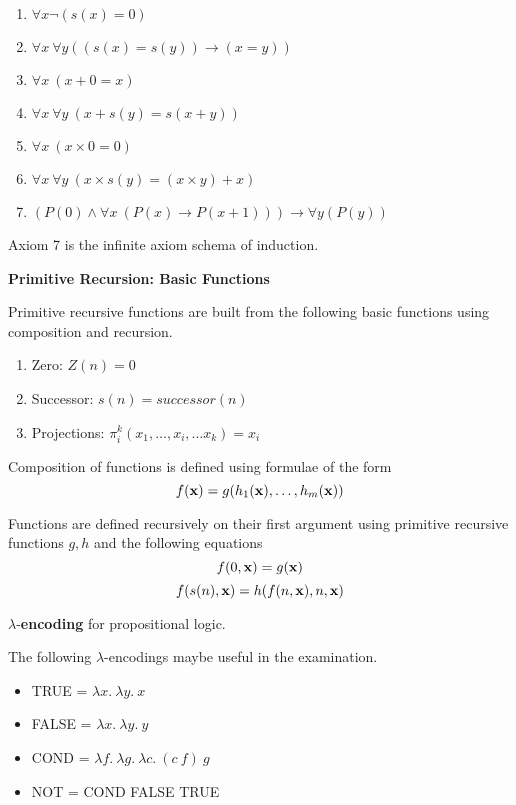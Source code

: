 \documentclass[11pt]{report}
\begin{document}
\begin{enumerate}
	\item $\forall x \lnot(s(x) = 0)$
	\item $\forall x \ \forall y ((s(x) = s(y)) \to (x = y))$
	\item $\forall x \ (x + 0 = x)$
	\item $\forall x \ \forall y \ (x + s(y) = s(x + y))$
	\item $\forall x \ (x \times 0 = 0)$
	\item $\forall x \ \forall y \ (x \times s(y) = (x \times y) + x)$
	\item $(P(0) \land \forall x \ (P(x) \to P(x+1))) \rightarrow \forall y (P(y))$
\end{enumerate}
Axiom 7 is the infinite axiom schema of induction. 

\vspace{0.75cm}

{\bf Primitive Recursion: Basic Functions}

Primitive recursive functions are built from the following basic functions using composition and recursion.

\begin{enumerate}
	\item[] Zero: $Z(n) = 0$
	\item[] Successor: $s(n) = successor(n)$
	\item[] Projections: $\pi_{i}^{k}(x_{1},\dots, x_{i},\dots x_{k}) = x_{i}$
\end{enumerate}

Composition of functions is defined using formulae of the form 
$$f({\bf x}) = g(h_{1}({\bf x}),\dots , h_{m}({\bf x}))$$

Functions are defined recursively on their first argument using primitive recursive functions $g,h$ and the following equations 
$$f(0,{\bf x}) = g({\bf x})$$
$$f(s(n),{\bf x}) = h(f(n,{\bf x}),n,{\bf x})$$

\vspace{0.75cm}

$\lambda$-{\bf encoding} for propositional logic. 

The following $\lambda$-encodings maybe useful in the examination.
	\begin{itemize}
		\item[] TRUE = $\lambda x. \ \lambda y. \ x$ 
		\item[] FALSE = $\lambda x. \ \lambda y. \ y$
		\item[] COND = $\lambda f. \ \lambda g. \ \lambda c. \ (c \ f) \ g$
		\item[] NOT = COND FALSE TRUE 
	\end{itemize}
\end{document}
